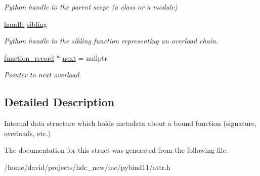 \begin{DoxyCompactItemize}
\begin{DoxyCompactList}\small\item\em Python handle to the parent scope (a class or a module) \end{DoxyCompactList}\item 
\hyperlink{classhandle}{handle} \hyperlink{structfunction__record_a647a4421f0491047b6ea680efd2c0e45}{sibling}\hypertarget{structfunction__record_a647a4421f0491047b6ea680efd2c0e45}{}\label{structfunction__record_a647a4421f0491047b6ea680efd2c0e45}

\begin{DoxyCompactList}\small\item\em Python handle to the sibling function representing an overload chain. \end{DoxyCompactList}\item 
\hyperlink{structfunction__record}{function\+\_\+record} $\ast$ \hyperlink{structfunction__record_a141b30999d54286b04d06ad6180dbf99}{next} = nullptr\hypertarget{structfunction__record_a141b30999d54286b04d06ad6180dbf99}{}\label{structfunction__record_a141b30999d54286b04d06ad6180dbf99}

\begin{DoxyCompactList}\small\item\em Pointer to next overload. \end{DoxyCompactList}\end{DoxyCompactItemize}


\subsection{Detailed Description}
Internal data structure which holds metadata about a bound function (signature, overloads, etc.) 

The documentation for this struct was generated from the following file\+:\begin{DoxyCompactItemize}
\item 
/home/david/projects/hdc\+\_\+new/inc/pybind11/attr.\+h\end{DoxyCompactItemize}
